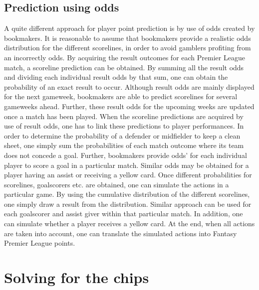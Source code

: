 \subsection{Prediction using odds}
A quite different approach for player point prediction is by use of odds created by bookmakers. It is reasonable to assume that bookmakers provide a realistic odds distribution for the different scorelines, in order to avoid gamblers profiting from an incorrectly odds. By acquiring the result outcomes for each Premier League match, a scoreline prediction can be obtained. By summing all the result odds and dividing each individual result odds by that sum, one can obtain the probability of an exact result to occur. Although result odds are mainly displayed for the next gameweek, bookmakers are able to predict scorelines for several gameweeks ahead. Further, these result odds for the upcoming weeks are updated once a match has been played. 
\newpar
When the scoreline predictions are acquired by use of result odds, one has to link these predictions to player performances. In order to determine the probability of a defender or midfielder to keep a clean sheet, one simply sum the probabilities of each match outcome where its team does not concede a goal. Further, bookmakers provide odds' for each individual player to score a goal in a particular match. Similar odds may be obtained for a player having an assist or receiving a yellow card. 
\newpar
Once different probabilities for scorelines, goalscorers etc. are obtained, one can simulate the actions in a particular game. By using the cumulative distribution of the different scorelines, one simply draw a result from the distribution. Similar approach can be used for each goalscorer and assist giver within that particular match. In addition, one can simulate whether a player receives a yellow card. At the end, when all actions are taken into account, one can translate the simulated actions into Fantasy Premier League points. 
\section{Solving for the chips}


